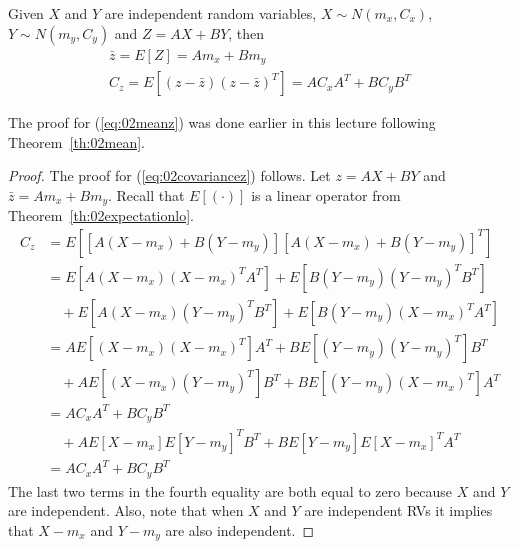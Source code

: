 \begin{theorem}%
\label{th:02covariance}
Given $X$ and $Y$ are independent random variables, $X\sim N(m_x,C_x)$, $Y\sim N(m_y,C_y)$ and $Z=AX+BY$, then
\begin{align}
\label{eq:02meanz}
\bar{z} = E[Z] = Am_x+Bm_y \\
\label{eq:02covariancez}
C_z = E[(z-\bar{z}){(z-\bar{z})}^T] = AC_x A^T + BC_y B^T
\end{align}
\end{theorem}

The proof for (\ref{eq:02meanz}) was done earlier in this lecture following Theorem~\ref{th:02mean}.

\begin{proof}
The proof for (\ref{eq:02covariancez}) follows.
Let $z=AX+BY$ and $\bar{z}=Am_x+Bm_y$.
Recall that $E[(\cdot)]$ is a linear operator from Theorem~\ref{th:02expectationlo}.
\begin{align*}
C_z &= E\left[[A(X-m_x)+B(Y-m_y)]{[A(X-m_x)+B(Y-m_y)]}^T\right] \\
    &= E[A(X-m_x){(X-m_x)}^T A^T] + E[B(Y-m_y){(Y-m_y)}^T B^T] \\
    &\quad + E[A(X-m_x){(Y-m_y)}^T B^T] + E[B(Y-m_y){(X-m_x)}^T A^T] \\
    &= AE[(X-m_x){(X-m_x)}^T]A^T + BE[(Y-m_y){(Y-m_y)}^T]B^T \\
    &\quad + AE[(X-m_x){(Y-m_y)}^T]B^T + BE[(Y-m_y){(X-m_x)}^T]A^T \\
    &= AC_x A^T + BC_y B^T \\
    &\quad + AE[X-m_x]E{[Y-m_y]}^T B^T + BE[Y-m_y]E{[X-m_x]}^T A^T \\
    &= AC_x A^T + BC_y B^T
\end{align*}
The last two terms in the fourth equality are both equal to zero because $X$ and $Y$ are independent.
Also, note that when $X$ and $Y$ are independent RVs it implies that $X-m_x$ and $Y-m_y$ are also independent.
\end{proof}

